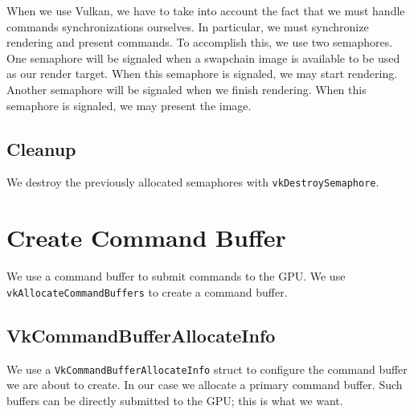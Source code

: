 When we use Vulkan, we have to take into account the fact that we must
handle commands synchronizations ourselves.
In particular, we must synchronize rendering and present commands.
To accomplish this, we use two semaphores.
One semaphore will be signaled when a swapchain image is available to
be used as our render target.
When this semaphore is signaled, we may start rendering.
Another semaphore will be signaled when we finish rendering.
When this semaphore is signaled, we may present the image.

\begin{minipage}{\linewidth}{\noindent}
    
\end{minipage}

\subsection{Cleanup}

We destroy the previously allocated semaphores with \texttt{vkDestroySemaphore}.

\section{Create Command Buffer}

We use a command buffer to submit commands to the GPU.
We use \texttt{vkAllocateCommandBuffers} to create a command buffer.

\begin{minipage}{\linewidth}{\noindent}
    
\end{minipage}

\subsection{VkCommandBufferAllocateInfo}

We use a \texttt{VkCommandBufferAllocateInfo} struct to configure the
command buffer we are about to create.
In our case we allocate a primary command buffer.
Such buffers can be directly submitted to the GPU; this is what we want.

\begin{minipage}{\linewidth}{\noindent}
    
\end{minipage}

